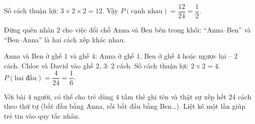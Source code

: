{Số cách thuận lợi: $3\times2\times2=12$. Vậy $P(\text{cạnh nhau})=\dfrac{12}{24}=\dfrac12$.
\begin{warnbox}Đừng quên nhân $2$ cho việc đổi chỗ Anna và Ben bên trong khối: ``Anna--Ben'' và ``Ben--Anna'' là hai cách xếp khác nhau.\end{warnbox}
Anna và Ben ở ghế $1$ và ghế $4$: Anna ở ghế $1$, Ben ở ghế $4$ hoặc ngược lại -- $2$ cách. Chloe và David vào ghế $2$, $3$: $2$ cách. Số cách thuận lợi: $2\times2=4$.
$P(\text{hai đầu})=\dfrac{4}{24}=\dfrac16$.
\begin{parentbox}Với bài $4$ người, có thể cho trẻ dùng $4$ tấm thẻ ghi tên và thật sự xếp hết $24$ cách theo thứ tự (bắt đầu bằng Anna, rồi bắt đầu bằng Ben\ldots). Liệt kê một lần giúp trẻ tin vào quy tắc nhân.\end{parentbox}
}

